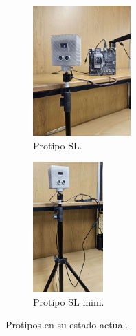\begin{figure}[bth]
    \begin{subfigure}{.45\textwidth}
        \centering
        \includegraphics[height=5cm]{imgs/prototipo-sl.jpeg}
        \caption{Protipo SL.}
        \label{fig:prot-sl}
    \end{subfigure}
    \begin{subfigure}{.45\textwidth}
        \centering
        \includegraphics[height=5cm]{imgs/prototipo-sl-mini.jpeg}
        \caption{Protipo SL mini.}
        \label{fig:prot-sl-mini}
    \end{subfigure}
    \caption{Protipos en su estado actual.}
    \label{fig:prototipos}
\end{figure}


